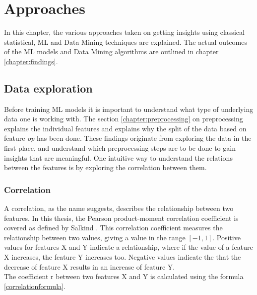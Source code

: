 \chapter{Approaches}\label{chapter:approaches}
In this chapter, the various approaches taken on getting insights using classical statistical, \ac{ML} and Data Mining techniques are explained. The actual outcomes of the \ac{ML} models and Data Mining algorithms are outlined in chapter \ref{chapter:findings}.

\section{Data exploration}
Before training \ac{ML} models it is important to understand what type of underlying data one is working with. The section \ref{chapter:preprocessing} on preprocessing explains the individual features and explains why the split of the data based on feature \textit{op} has been done. These findings originate from exploring the data in the first place, and understand which preprocessing steps are to be done to gain insights that are meaningful. One intuitive way to understand the relations between the features is by exploring the correlation between them. 

\subsection{Correlation}\label{correlationchapter}
A correlation, as the name suggests, describes the relationship between two features. In this thesis, the Pearson product-moment correlation coefficient is covered as defined by Salkind \parencite{salkind2011statistics}. This correlation coefficient measures the relationship between two values, giving a value in the range $[-1,1]$. Positive values for features X and Y indicate a relationship, where if the value of a feature X increases, the feature Y increases too. Negative values indicate the that the decrease of feature X results in an increase of feature Y. \\
The coefficient r between two features X and Y is calculated using the formula \ref{correlationformula}.

